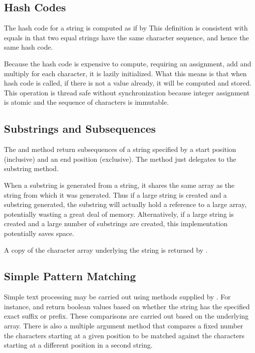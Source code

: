\subsection{Hash Codes}

The hash code for a string  is computed as if by
%
%
This definition is consistent with equals in that two equal strings
have the same character sequence, and hence the same hash code.

Because the hash code is expensive to compute, requiring an
assignment, add and multiply for each character, it is lazily
initialized.  What this means is that when hash code is called, if
there is not a value already, it will be computed and stored. This
operation is thread safe without synchronization because integer
assignment is atomic and the sequence of characters is immutable.

\subsection{Substrings and Subsequences}

The  and method return subsequences of a
string specified by a start position (inclusive) and an end position
(exclusive).  The  method just delegates to
the substring method.

When a substring is generated from a string, it shares the same array
as the string from which it was generated.  Thus if a large string is
created and a substring generated, the substring will actually hold a
reference to a large array, potentially wasting a great deal of
memory.  Alternatively, if a large string is created and a large
number of substrings are created, this implementation potentially
saves space.

A copy of the character array underlying the string is returned
by .  

\subsection{Simple Pattern Matching}

Simple text processing may be carried out using methods supplied
by .  For instance,  and
 return boolean values based on whether
the string has the specified exact suffix or prefix.  These
comparisons are carried out based on the underlying 
array.  There is also a multiple argument 
method that compares a fixed number the characters starting at a given
position to be matched against the characters starting at a different
position in a second string.

